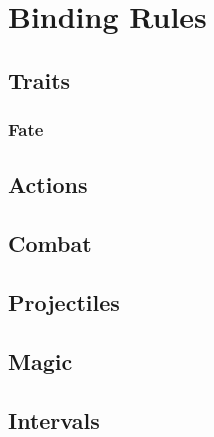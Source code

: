 \documentclass[a4paper,openany]{book}
\date{\today}
\begin{document}
\frontmatter

\section*{Binding Rules}

\physicalSkillChart

\mentalSkillChart

\begin{multicols}{2}

\subsection*{Traits}





\subsubsection*{Fate}


\subsubsection*{}




\subsection*{Actions}






\subsection*{Combat}





\commonWeaponsChart



\commonArmourChart

\subsection*{Projectiles}



\subsection*{Magic}



\subsection*{Intervals}



\end{multicols}
\end{document}
